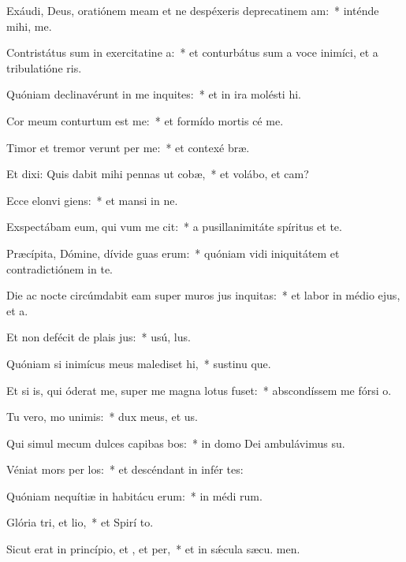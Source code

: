 \item Exáudi, Deus, oratiónem meam et ne despéxeris deprecatinem am:~* inténde mihi,   me.
\item Contristátus sum in exercitatine a:~* et conturbátus sum a voce inimíci, et a tribulatióne ris.
\item Quóniam declinavérunt in me inquites:~* et in ira molésti  hi.
\item Cor meum conturtum est  me:~* et formído mortis cé  me.
\item Timor et tremor verunt per me:~* et contexé  bræ.
\item Et dixi: Quis dabit mihi pennas ut cobæ,~* et volábo, et cam?
\item Ecce elonvi giens:~* et mansi in ne.
\item Exspectábam eum, qui vum me cit:~* a pusillanimitáte spíritus et te.
\item Præcípita, Dómine, dívide guas erum:~* quóniam vidi iniquitátem et contradictiónem in te.
\item Die ac nocte circúmdabit eam super muros jus inquitas:~* et labor in médio ejus, et a.
\item Et non defécit de plais jus:~* usú,  lus.
\item Quóniam si inimícus meus malediset hi,~* sustinu que.
\item Et si is, qui óderat me, super me magna lotus fuset:~* abscondíssem me fórsi  o.
\item Tu vero, mo unimis:~* dux meus, et  us.
\item Qui simul mecum dulces capibas bos:~* in domo Dei ambulávimus  su.
\item Véniat mors per los:~* et descéndant in infér tes:
\item Quóniam nequítiæ in habitácu erum:~* in médi rum.
\item Glória tri, et lio,~* et Spirí to.
\item Sicut erat in princípio, et , et per,~* et in sǽcula sæcu. men.
